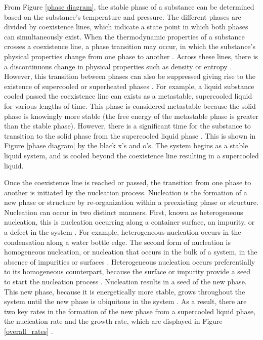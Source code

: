 From Figure \ref{phase diagram}, the stable phase of a substance can be determined based on the substance's temperature and pressure.  The different phases are divided by coexistence lines, which indicate a state point in which both phases can simultaneously exist.  When the thermodynamic properties of a substance crosses a coexistence line, a phase transition may occur, in which the substance's physical properties change from one phase to another \cite{askeland2011the}.  Across these lines, there is a discontinuous change in physical properties such as density or entropy \cite{EGELSTAFF}.  However, this transition between phases can also be suppressed giving rise to the existence of supercooled or superheated phases \cite{askeland2011the}.  For example, a liquid substance cooled passed the coexistence line can exists as a metastable, supercooled liquid for various lengths of time.  This phase is considered metastable because the solid phase is knowingly more stable (the free energy of the metastable phase is greater than the stable phase).  However, there is a significant time for the substance to transition to the solid phase from the supercooled liquid phase \cite{Sear2016}.  This is shown in Figure \ref{phase diagram} by the black x's and o's.  The system begins as a stable liquid system, and is cooled beyond the coexistence line resulting in a supercooled liquid.

Once the coexistence line is reached or passed, the transition from one phase to another is initiated by the nucleation process.  Nucleation is the formation of a new phase or structure by re-organization within a preexisting phase or structure.  Nucleation can occur in two distinct manners.  First, known as heterogeneous nucleation, this is nucleation occurring along a container surface, an impurity, or a defect in the system \cite{Schmelzer2005}.  For example, heterogeneous nucleation occurs in the condensation along a water bottle edge.  The second form of nucleation is homogeneous nucleation, or nucleation that occurs in the bulk of a system, in the absence of impurities or surfaces \cite{Schmelzer2005}.  Heterogeneous nucleation occurs preferentially to its homogeneous counterpart, because the surface or impurity provide a seed to start the nucleation process \cite{Schmelzer2005}.  Nucleation results in a seed of the new phase.  This new phase, because it is energetically more stable, grows throughout the system until the new phase is ubiquitous in the system \cite{Schmelzer2005}.  As a result, there are two key rates in the formation of the new phase from a supercooled liquid phase, the nucleation rate and the growth rate, which are displayed in Figure \ref{overall_rates} \cite{barrett1973the}.

